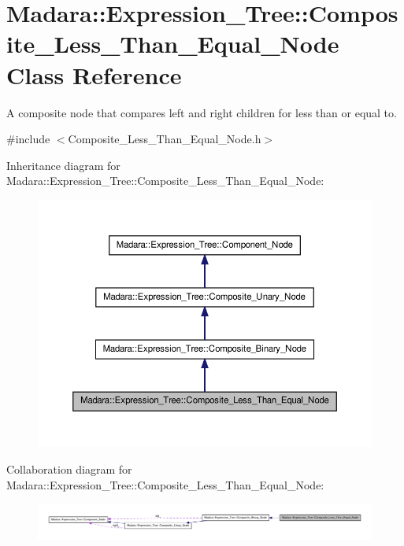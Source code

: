 \hypertarget{classMadara_1_1Expression__Tree_1_1Composite__Less__Than__Equal__Node}{
\section{Madara::Expression\_\-Tree::Composite\_\-Less\_\-Than\_\-Equal\_\-Node Class Reference}
\label{d7/d10/classMadara_1_1Expression__Tree_1_1Composite__Less__Than__Equal__Node}
}


A composite node that compares left and right children for less than or equal to.  




{\ttfamily \#include $<$Composite\_\-Less\_\-Than\_\-Equal\_\-Node.h$>$}



Inheritance diagram for Madara::Expression\_\-Tree::Composite\_\-Less\_\-Than\_\-Equal\_\-Node:
\nopagebreak
\begin{figure}[H]
\begin{center}
\leavevmode
\includegraphics[width=372pt]{d0/dfc/classMadara_1_1Expression__Tree_1_1Composite__Less__Than__Equal__Node__inherit__graph}
\end{center}
\end{figure}


Collaboration diagram for Madara::Expression\_\-Tree::Composite\_\-Less\_\-Than\_\-Equal\_\-Node:
\nopagebreak
\begin{figure}[H]
\begin{center}
\leavevmode
\includegraphics[width=400pt]{d4/dd9/classMadara_1_1Expression__Tree_1_1Composite__Less__Than__Equal__Node__coll__graph}
\end{center}
\end{figure}
